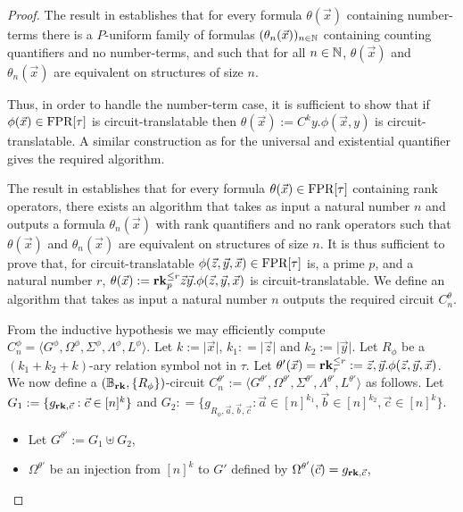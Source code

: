 \documentclass[../paper.tex]{subfiles}
\begin{document}
\begin{proof}
  The result in \cite{} establishes that for every formula $\theta(\vec{x})$
  containing number-terms there is a $P$-uniform family of formulas
  $(\theta_n(\vec{x}))_{n \in \mathbb{N}}$ containing counting quantifiers and no
  number-terms, and such that for all $n \in \mathbb{N}$, $\theta(\vec{x})$ and
  $\theta_n(\vec{x})$ are equivalent on structures of size $n$.
  
  Thus, in order to handle the number-term case, it is sufficient to show that
  if $\phi(\vec{x}) \in \text{\upshape FPR}[\tau]$ is circuit-translatable then
  $\theta(\vec{x}) := C^{k}y. \phi(\vec{x}, y)$ is circuit-translatable.
  A similar construction as for the universal and existential quantifier gives
  the required algorithm.

  The result in \cite{} establishes that for every formula $\theta(\vec{x}) \in
  \text{\upshape FPR}[\tau]$ containing rank operators, there exists an algorithm that takes as
  input a natural number $n$ and outputs a formula $\theta_n(\vec{x})$ with rank
  quantifiers and no rank operators such that $\theta(\vec{x})$ and
  $\theta_n(\vec{x})$ are equivalent on structures of size $n$. It is thus
  sufficient to prove that, for circuit-translatable $\phi(\vec{z},
  \vec{y}, \vec{x}) \in \text{\upshape FPR}[\tau]$ is, a prime $p$, and a natural number $r$,
  $\theta(\vec{x}) := \text{\textbf{rk}}^{\leq r}_p \vec{z} \vec{y}. \phi(\vec{z}, \vec{y},
  \vec{x})$ is circuit-translatable. We define an algorithm that takes as input
  a natural number $n$ outputs the required circuit $C^{\theta}_n$.

  From the inductive hypothesis we may efficiently compute $C^{\phi}_n = \langle
  G^{\phi}, \Omega^{\phi}, \Sigma^{\phi}, \Lambda^{\phi}, L^{\phi} \rangle$. Let
  $k:= \vert \vec{x} \vert$, $k_1 : = \vert \vec{z} \vert$ and $k_2 := \vert
  \vec{y} \vert$. Let $R_\phi$ be a $(k_1 + k_2 + k)$-ary relation symbol not in
  $\tau$. Let $\theta'(\vec{x}) = \text{\textbf{rk}}^{\leq r}_r := \vec{z}, \vec{y}. \phi
  (\vec{z}, \vec{y}, \vec{x})$. We now define a $(\mathbb{B}_{\text{\textbf{rk}}}, \{
  R_{\phi} \})$-circuit $C^{\theta'}_n:= \langle G^{\theta'}, \Omega^{\theta'},
  \Sigma^{\theta'}, \Lambda^{\theta'}, L^{\theta'}\rangle$ as follows. Let $G_1
  := \{g_{\text{\textbf{rk}}, \vec{c}} : \vec{c} \in [n]^k\}$ and $G_2 : = \{ g_{R_{\phi},
    \vec{a}, \vec{b}, \vec{c}} : \vec{a} \in [n]^{k_1}, \vec{b} \in [n]^{k_2},
  \vec{c} \in [n]^{k}\}$.
  
  \begin{itemize}
    \setlength\itemsep{0mm}
  \item Let $G^{\theta'} := G_1 \uplus G_2$,
  \item $\Omega^{\theta'}$ be an injection from $[n]^k$ to $G'$ defined by
    $\Omega^{\theta'}(\vec{c}) = g_{\text{\textbf{rk}}, \vec{c}}$,


\end{itemize}
\end{proof}
\end{document}
